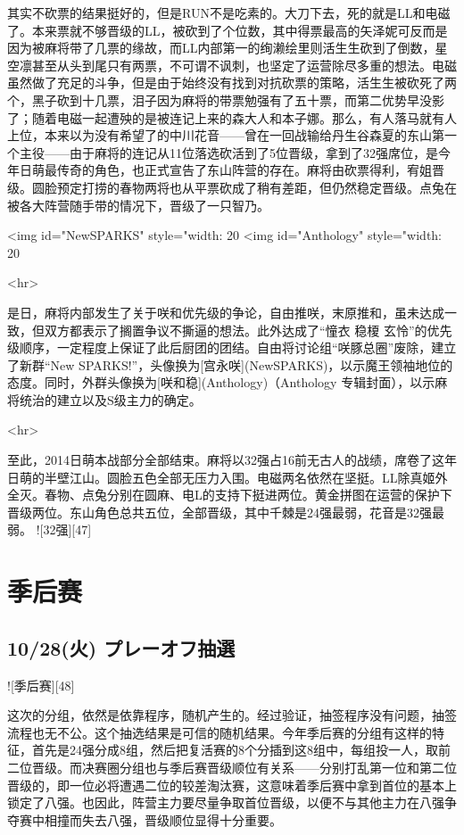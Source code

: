其实不砍票的结果挺好的，但是RUN不是吃素的。大刀下去，死的就是LL和电磁了。本来票就不够晋级的LL，被砍到了个位数，其中得票最高的矢泽妮可反而是因为被麻将带了几票的缘故，而LL内部第一的绚濑绘里则活生生砍到了倒数，星空凛甚至从头到尾只有两票，不可谓不讽刺，也坚定了运营除尽多重的想法。电磁虽然做了充足的斗争，但是由于始终没有找到对抗砍票的策略，活生生被砍死了两个，黑子砍到十几票，泪子因为麻将的带票勉强有了五十票，而第二优势早没影了；随着电磁一起遭殃的是被连记上来的森大人和本子娜。那么，有人落马就有人上位，本来以为没有希望了的中川花音——曾在一回战输给丹生谷森夏的东山第一个主役——由于麻将的连记从11位落选砍活到了5位晋级，拿到了32强席位，是今年日萌最传奇的角色，也正式宣告了东山阵营的存在。麻将由砍票得利，宥姐晋级。圆脸预定打捞的春物两将也从平票砍成了稍有差距，但仍然稳定晋级。点兔在被各大阵营随手带的情况下，晋级了一只智乃。

<img id="NewSPARKS" style="width: 20%
<img id="Anthology" style="width: 20%

<hr>

是日，麻将内部发生了关于咲和优先级的争论，自由推咲，末原推和，虽未达成一致，但双方都表示了搁置争议不撕逼的想法。此外达成了“憧衣 稳榎 玄怜”的优先级顺序，一定程度上保证了此后厨团的团结。自由将讨论组“咲豚总圈”废除，建立了新群“New SPARKS!”，头像换为[宫永咲](NewSPARKS)，以示魔王领袖地位的态度。同时，外群头像换为[咲和稳](Anthology)（Anthology 专辑封面），以示麻将统治的建立以及S级主力的确定。

<hr>

至此，2014日萌本战部分全部结束。麻将以32强占16前无古人的战绩，席卷了这年日萌的半壁江山。圆脸五色全部无压力入围。电磁两名依然在坚挺。LL除真姬外全灭。春物、点兔分别在圆麻、电L的支持下挺进两位。黄金拼图在运营的保护下晋级两位。东山角色总共五位，全部晋级，其中千棘是24强最弱，花音是32强最弱。
![32强][47]

\section{季后赛}

\subsection{10/28(火) プレーオフ抽選}

![季后赛][48]

这次的分组，依然是依靠程序，随机产生的。经过验证，抽签程序没有问题，抽签流程也无不公。这个抽选结果是可信的随机结果。今年季后赛的分组有这样的特征，首先是24强分成8组，然后把复活赛的8个分插到这8组中，每组投一人，取前二位晋级。而决赛圈分组也与季后赛晋级顺位有关系——分别打乱第一位和第二位晋级的，即一位必将遭遇二位的较差淘汰赛，这意味着季后赛中拿到首位的基本上锁定了八强。也因此，阵营主力要尽量争取首位晋级，以便不与其他主力在八强争夺赛中相撞而失去八强，晋级顺位显得十分重要。

